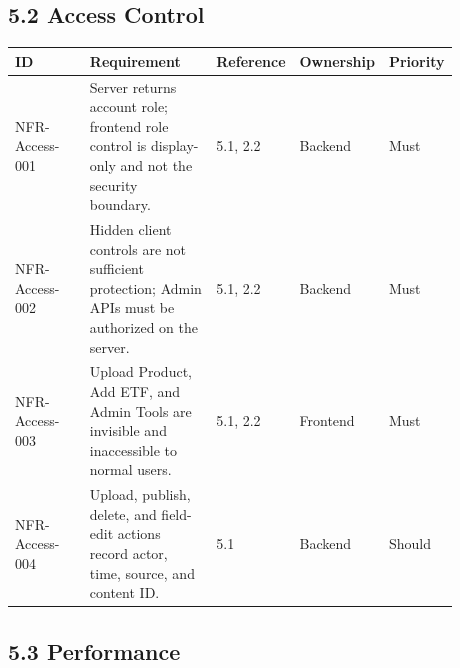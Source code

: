 \subsection{5.2 Access Control}

\begingroup
\small
\begin{longtable}{L{0.18\linewidth}L{0.30\linewidth}L{0.18\linewidth}L{0.12\linewidth}L{0.10\linewidth}}
\toprule
\textbf{ID} & \textbf{Requirement} & \textbf{Reference} & \textbf{Ownership} & \textbf{Priority} \\
\midrule
NFR-Access-001 & Server returns account role; frontend role control is display-only and not the security boundary. & 5.1, 2.2 & Backend & Must \\
NFR-Access-002 & Hidden client controls are not sufficient protection; Admin APIs must be authorized on the server. & 5.1, 2.2 & Backend & Must \\
NFR-Access-003 & Upload Product, Add ETF, and Admin Tools are invisible and inaccessible to normal users. & 5.1, 2.2 & Frontend & Must \\
NFR-Access-004 & Upload, publish, delete, and field-edit actions record actor, time, source, and content ID. & 5.1 & Backend & Should \\
\bottomrule
\end{longtable}
\endgroup

\subsection{5.3 Performance}

